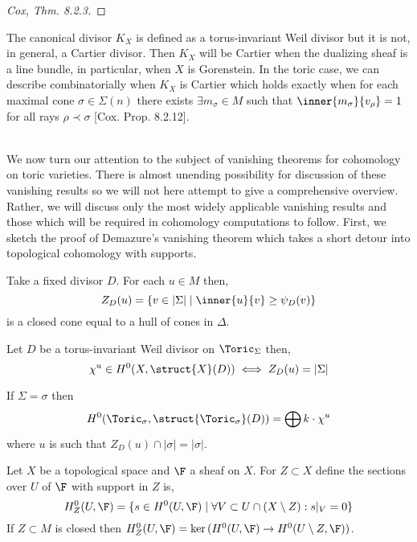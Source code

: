 \documentclass[12pt]{article}
\begin{document}
\begin{proof}
[Cox, Thm. 8.2.3]
\end{proof}

\begin{rmk}
The canonical divisor $K_X$ is defined as a torus-invariant Weil divisor but it is not, in general, a Cartier divisor. Then $K_X$ will be Cartier when the dualizing sheaf is a line bundle, in particular, when $X$ is Gorenstein. In the toric case, we can describe combinatorially when $K_X$ is Cartier which holds exactly when for each maximal cone $\sigma \in \Sigma(n)$ there exists $\exists m_\sigma \in M$ such that $\inner{m_\sigma}{v_\rho} = 1$ for all rays $\rho \prec \sigma$ [Cox. Prop. 8.2.12]. 
\end{rmk}
\noindent\\
We now turn our attention to the subject of vanishing theorems for cohomology on toric varieties. There is almost unending possibility for discussion of these vanishing results so we will not here attempt to give a comprehensive overview. Rather, we will discuss only the most widely applicable vanishing results and those which will be required in cohomology computations to follow. First, we sketch the proof of Demazure's vanishing theorem which takes a short detour into topological cohomology with supports.


\begin{definition}
Take a fixed divisor $D$. For each $u \in M$ then,
\[ Z_D(u) = \{ v \in |\Sigma| \mid \inner{u}{v} \ge \psi_D(v) \} \]
is a closed cone equal to a hull of cones in $\Delta$. 
\end{definition}

\begin{corollary}
Let $D$ be a torus-invariant Weil divisor on $\Toric_\Sigma$ then,
\[ \chi^u \in H^0(X, \struct{X}(D)) \iff Z_D(u) = |\Sigma| \]
\end{corollary}

\begin{example}
If $\Sigma = \sigma$ then
\[ H^0(\Toric_\sigma, \struct{\Toric_\sigma}(D)) = \bigoplus k \cdot \chi^u \]
where $u$ is such that $Z_D(u) \cap |\sigma| = |\sigma|$. 
\end{example}

\begin{definition}
Let $X$ be a topological space and $\F$ a sheaf on $X$. For $Z \subset X$ define the sections over $U$ of $\F$ with support in $Z$ is,
\[ H^0_Z(U, \F) = \{ s \in H^0(U, \F) \mid \forall V \subset U \cap (X \setminus Z) : s|_V = 0 \} \]
If $Z \subset M$ is closed then $H^0_Z(U, \F) = \ker{(H^0(U, \F) \to H^0(U \setminus Z, \F))}$. 
\end{definition}
\end{document}
